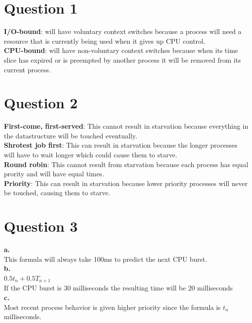 \documentclass[11pt]{article}
\begin{document}
\maketitle

\section*{Question 1}
\textbf{I/O-bound}: will have voluntary context switches because
a process will need a resource that is currently being used
when it gives up CPU control.\\
\textbf{CPU-bound}: will have non-voluntary context switches because when
its time slice has expired or is preempted by another
process it will be removed from its current process.

\section*{Question 2}
\textbf{First-come, first-served}: This cannot result in starvation because
everything in the datastructure will be touched eventually.\\
\textbf{Shrotest job first}: This can result in starvation because the
longer processes will have to wait longer which could cause them 
to starve.\\
\textbf{Round robin}: This cannot result from starvation because each
process has equal prority and will have equal times.\\
\textbf{Priority}: This can result in starvation because lower priority
processes will never be touched, causing them to starve.

\section*{Question 3}
\textbf{a.}\\
This formula will always take 100ms to predict the next CPU burst.\\
\textbf{b.}\\
$0.5t_n + 0.5T_{n+1}$\\
If the CPU burst is 30 milliseconds the resulting time will be 
20 milliseconds\\
\textbf{c.}\\
Most recent process behavior is given higher priority since the 
formula is $t_n$ milliseconds.
\end{document}
